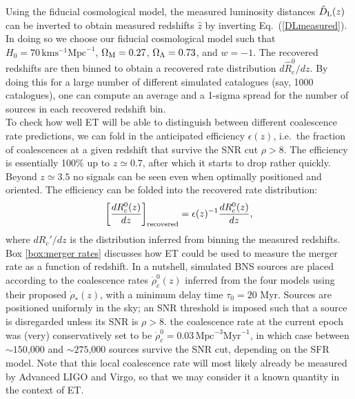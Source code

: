 {%
Using the fiducial cosmological model, the measured luminosity distances 
$\hat{D}_{\rm L}(z)$ can be inverted to obtain measured redshifts 
$\hat{z}$ by inverting Eq.~(\ref{DLmeasured}).  In doing so we choose our 
fiducial cosmological model such that $H_0 = 70\,\mbox{km}\mbox{s}^{-1}
\mbox{Mpc}^{-1}$, $\Omega_{\rm M} = 0.27$, $\Omega_{\rm \Lambda} = 0.73$, 
and $w = -1$.
The recovered redshifts are then binned to obtain a recovered rate 
distribution $d\hat{R}^0_c/dz$. 
By doing this for a large number of different simulated catalogues 
(say, 1000 catalogues), one can compute an average and a 1-sigma spread 
for the number of sources in each recovered redshift bin.
\\[5pt]
To check how well ET will be able to distinguish between different coalescence 
rate predictions, we can fold in the anticipated efficiency $\epsilon(z)$, i.e.\  the 
fraction of coalescences at a given redshift that survive the SNR 
cut $\rho > 8$. The efficiency is 
essentially 100\% up to $z \simeq 0.7$, after which it starts to drop rather quickly. 
Beyond $z \simeq 3.5$ no signals can be seen even when optimally positioned 
and oriented. The efficiency can be folded into the recovered rate distribution:
\begin{equation}
\left[ \frac{dR^0_c(z)}{dz} \right]_{\rm recovered} = 
\epsilon(z)^{-1} \frac{dR_c^0(z)}{dz},
\end{equation}
where $dR_c'/dz$ is the distribution inferred from binning the measured redshifts.
}
Box \ref{box:merger rates} discusses how ET could be used to measure
the merger rate as a function of redshift.
In a nutshell, simulated BNS sources are placed according to the 
coalescence rates $\dot{\rho}^0_c(z)$ inferred from the four models 
using their proposed $\dot{\rho}_\ast(z)$, with a minimum delay time 
$\tau_0 = 20$ Myr. Sources are positioned uniformly in the sky; an SNR 
threshold is imposed such that a source is disregarded unless its SNR is 
$\rho > 8$. the coalescence rate at the current epoch was (very) conservatively set 
to be $\dot{\rho}^0_c = 0.03\,\mbox{Mpc}^{-3}\mbox{Myr}^{-1}$, 
in which case between $\sim 150$,000 and $\sim 275$,000 sources survive 
the SNR cut, depending on the SFR model. Note that this local coalescence 
rate will most likely already be measured by Advanced LIGO and Virgo, so 
that we may consider it a known quantity in the context of ET.

